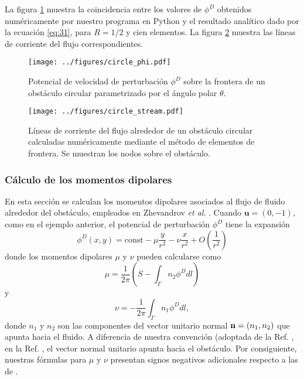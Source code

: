 \documentclass[11pt]{article}
\begin{document}
 La figura \ref{fig:circle_phi} muestra la coincidencia entre los valores de $\phi^D$ obtenidos numéricamente por nuestro programa en Python y el resultado analítico dado por la ecuación \eqref{eq:31}, para $R=1/2$ y cien elementos. La figura \ref{fig:circle_stream} muestra las líneas de corriente del flujo correspondientes.
\begin{figure}[h]
  \centering
      \texttt{[image: ../figures/circle\_phi.pdf]}
  \caption{Potencial de velocidad de perturbación $\phi^D$ sobre la frontera de un obstáculo circular parametrizado por el ángulo polar $\theta$.}
  \label{fig:circle_phi}
\end{figure}
\begin{figure}[h]
  \centering
      \texttt{[image: ../figures/circle\_stream.pdf]}
  \caption{Líneas de corriente del flujo alrededor de un obstáculo circular calculadas numéricamente mediante el método de elementos de frontera. Se muestran los nodos sobre el obstáculo.}
  \label{fig:circle_stream}
\end{figure}
\subsubsection{Cálculo de los momentos dipolares}
En esta sección se calculan los momentos dipolares asociados al flujo de fluido alrededor del obstáculo, empleados en Zhevandrov {\it et al}. \cite{zhevandrov2025discrete}. Cuando $\mathbf{u}=(0,-1)$, como en el ejemplo anterior, el potencial de perturbación $\phi^D$ tiene la expansión
\begin{equation}
  \label{eq:32}
  \phi^D(x,y) = \mathrm{const} - \mu\frac{y}{r^2} - \nu\frac{x}{r^2} + O\left(\frac{1}{r^2}\right)
\end{equation}
donde los momentos dipolares $\mu$ y $\nu$ pueden calcularse como
\begin{equation}
  \label{eq:33}
  \mu = \frac{1}{2\pi}\left(S - \int_\Gamma n_2\phi^D dl\right)
\end{equation}
y
\begin{equation}
  \label{eq:34}
  \nu = -\frac{1}{2\pi}  \int_\Gamma n_1\phi^D dl,
\end{equation}
donde $n_1$ y $n_2$ son las componentes del vector unitario normal ${\bf n}=(n_1, n_2)$ que apunta hacia el fluido. A diferencia de nuestra convención (adoptada de la Ref. \cite{pozrikidis2002practical}, en la Ref. \cite{zhevandrov2025discrete}, el vector normal unitario apunta hacia el obstáculo. Por consiguiente, nuestras fórmulas para $\mu$ y $\nu$ presentan signos negativos adicionales respecto a las de \cite{zhevandrov2025discrete}.
\end{document}
